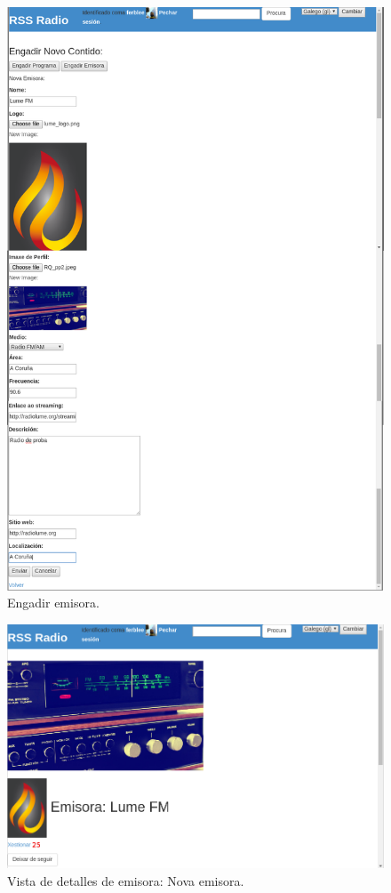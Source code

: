 \begin{figure}[H]
	\centering
	\includegraphics[scale=0.4,keepaspectratio=true]{./images/usermanual/um-add-station.png}
	\caption{Engadir emisora.}
	\label{fig:um-add-station}
\end{figure}

\break

\begin{figure}[H]
	\centering
	\includegraphics[scale=0.43,keepaspectratio=true]{./images/usermanual/um-stationd2.png}
	\caption{Vista de detalles de emisora: Nova emisora.}
	\label{fig:um-stationd2}
\end{figure}

